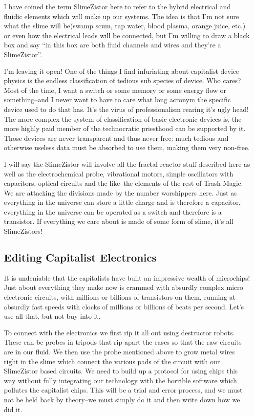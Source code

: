 I have coined the term SlimeZistor here to refer to the hybrid
electrical and fluidic elements which will make up our systems. The idea
is that I'm not sure what the slime will be(swamp scum, tap water, blood
plasma, orange juice, etc.) or even how the electrical leads will be
connected, but I'm willing to draw a black box and say ``in this box are
both fluid channels and wires and they're a SlimeZistor''.

I'm leaving it open! One of the things I find infuriating about
capitalist device physics is the endless classification of tedious sub
species of device. Who cares? Most of the time, I want a switch or some
memory or some energy flow or something--and I never want to have to
care what long acronym the specific device used to do that has. It's the
virus of professionalism rearing it's ugly head! The more complex the
system of classification of basic electronic devices is, the more highly
paid member of the technocratic priesthood can be supported by it. Those
devices are never transparent and thus never free: much tedious and
otherwise useless data must be absorbed to use them, making them very
non-free.

I will say the SlimeZistor will involve all the fractal reactor stuff
described here as well as the electrochemical probe, vibrational motors,
simple oscillators with capacitors, optical circuits and the like--the
elements of the rest of Trash Magic. We are attacking the divisions made
by the number worshippers here. Just as everything in the universe can
store a little charge and is therefore a capacitor, everything in the
universe can be operated as a switch and therefore is a transistor. If
everything we care about is made of some form of slime, it's all
SlimeZistors!

\subsection{Editing Capitalist
Electronics}\label{editing-capitalist-electronics}

It is undeniable that the capitalists have built an impressive wealth of
microchips! Just about everything they make now is crammed with absurdly
complex micro electronic circuits, with millions or billions of
transistors on them, running at absurdly fast speeds with clocks of
millions or billions of beats per second. Let's use all that, but not
buy into it.

To connect with the electronics we first rip it all out using destructor
robots. These can be probes in tripods that rip apart the cases so that
the raw circuits are in our fluid. We then use the probe mentioned above
to grow metal wires right in the slime which connect the various pads of
the circuit with our SlimeZistor based circuits. We need to build up a
protocol for using chips this way without fully integrating our
technology with the horrible software which pollutes the capitalist
chips. This will be a trial and error process, and we must not be held
back by theory--we must simply do it and then write down how we did it.


